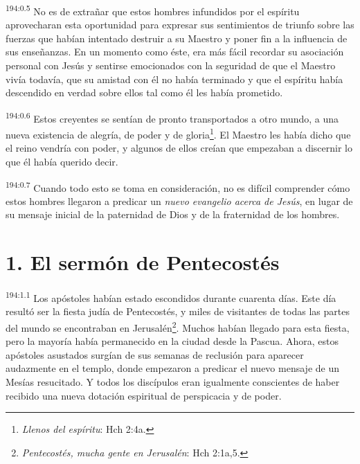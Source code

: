 \par 
\textsuperscript{194:0.5} No es de extrañar que estos hombres infundidos por el espíritu aprovecharan esta oportunidad para expresar sus sentimientos de triunfo sobre las fuerzas que habían intentado destruir a su Maestro y poner fin a la influencia de sus enseñanzas. En un momento como éste, era más fácil recordar su asociación personal con Jesús y sentirse emocionados con la seguridad de que el Maestro vivía todavía, que su amistad con él no había terminado y que el espíritu había descendido en verdad sobre ellos tal como él les había prometido.

\par 
\textsuperscript{194:0.6} Estos creyentes se sentían de pronto transportados a otro mundo, a una nueva existencia de alegría, de poder y de gloria\footnote{\textit{Llenos del espíritu}: Hch 2:4a.}. El Maestro les había dicho que el reino vendría con poder, y algunos de ellos creían que empezaban a discernir lo que él había querido decir.

\par 
\textsuperscript{194:0.7} Cuando todo esto se toma en consideración, no es difícil comprender cómo estos hombres llegaron a predicar un \textit{nuevo evangelio acerca de Jesús}, en lugar de su mensaje inicial de la paternidad de Dios y de la fraternidad de los hombres.

\section*{1. El sermón de Pentecostés}
\par 
\textsuperscript{194:1.1} Los apóstoles habían estado escondidos durante cuarenta días. Este día resultó ser la fiesta judía de Pentecostés, y miles de visitantes de todas las partes del mundo se encontraban en Jerusalén\footnote{\textit{Pentecostés, mucha gente en Jerusalén}: Hch 2:1a,5.}. Muchos habían llegado para esta fiesta, pero la mayoría había permanecido en la ciudad desde la Pascua. Ahora, estos apóstoles asustados surgían de sus semanas de reclusión para aparecer audazmente en el templo, donde empezaron a predicar el nuevo mensaje de un Mesías resucitado. Y todos los discípulos eran igualmente conscientes de haber recibido una nueva dotación espiritual de perspicacia y de poder.

